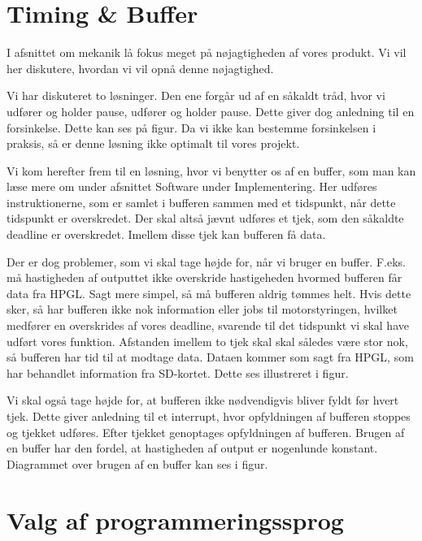 \section{Timing \& Buffer}

I afsnittet om mekanik lå fokus meget på nøjagtigheden af vores
produkt. Vi vil her diskutere, hvordan vi vil opnå denne nøjagtighed.

Vi har diskuteret to løsninger. Den ene forgår ud af en såkaldt tråd,
hvor vi udfører og holder pause, udfører og holder pause. Dette giver
dog anledning til en forsinkelse. Dette kan ses på figur.  Da vi ikke kan bestemme forsinkelsen i
praksis, så er denne løsning ikke optimalt til vores projekt.

Vi kom herefter frem til en løsning, hvor vi benytter os af en buffer,
som man kan læse mere om under afsnittet Software under
Implementering. Her udføres instruktionerne, som er samlet i bufferen
sammen med et tidspunkt, når dette tidspunkt er overskredet. Der skal
altså jævnt udføres et tjek, som den såkaldte deadline er
overskredet. Imellem disse tjek kan bufferen få data.

Der er dog problemer, som vi skal tage højde for, når vi bruger en
buffer. F.eks. må hastigheden af outputtet ikke overskride
hastigeheden hvormed bufferen får data fra HPGL. Sagt mere simpel, så
må bufferen aldrig tømmes helt. Hvis dette sker, så har bufferen ikke
nok information eller jobs til motorstyringen, hvilket medfører en
overskrides af vores deadline, svarende til det tidspunkt vi skal have
udført vores funktion. Afstanden imellem to tjek skal skal således
være stor nok, så bufferen har tid til at modtage data. Dataen kommer
som sagt fra HPGL, som har behandlet information fra SD-kortet. Dette
ses illustreret i figur.

Vi skal også tage højde for, at bufferen ikke nødvendigvis bliver
fyldt før hvert tjek. Dette giver anledning til et interrupt, hvor
opfyldningen af bufferen stoppes og tjekket udføres. Efter tjekket
genoptages opfyldningen af bufferen. Brugen af en buffer har den
fordel, at hastigheden af output er nogenlunde konstant. Diagrammet
over brugen af en buffer kan ses i figur.



\section{Valg af programmeringssprog}

